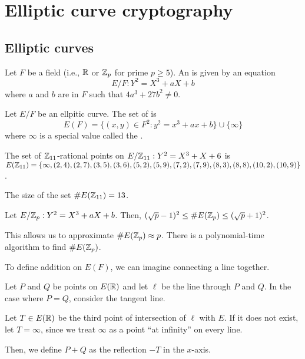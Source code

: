 \documentclass[class=co487,tikz,minted,notes]{agony}
\begin{document}
\chapter{Elliptic curve cryptography}
\section{Elliptic curves}

\begin{defn}
  Let $F$ be a field (i.e., $\mathbb{R}$ or $\mathbb{Z}_p$ for prime $p \geq 5$).
  An  is given by an equation
  \[ E/F : Y^2 = X^3 + aX + b \]
  where $a$ and $b$ are in $F$ such that $4a^3 + 27b^2 \neq 0$.
\end{defn}

\begin{defn}
  Let $E/F$ be an ellpitic curve.
  The set of  is
  \[ E(F) = \{(x,y) \in F^2 : y^2 = x^3 + ax + b\} \cup \{\infty\} \]
  where $\infty$ is a special value called the .
\end{defn}

\begin{example}\label{ex:ec1}
  The set of $\mathbb{Z}_{11}$-rational points on $E/\mathbb{Z}_{11} : Y^2 = X^3 + X + 6$
  is $E(\mathbb{Z}_{11}) = \{\infty, (2,4), (2,7), (3,5), (3,6), (5,2), (5,9),
    (7,2), (7,9), (8,3), (8,8), (10,2), (10,9)\}$.

  The size of the set $\#E(\mathbb{Z}_{11}) = 13$.
\end{example}

\begin{theorem}[Hasse]
  Let $E/\mathbb{Z}_p : Y^2 = X^3 + aX + b$.
  Then, $(\sqrt{p}-1)^2 \leq \#E(\mathbb{Z}_p) \leq (\sqrt{p}+1)^2$.
\end{theorem}

This allows us to approximate $\#E(\mathbb{Z}_p) \approx p$.
There is a polynomial-time algorithm to find $\#E(\mathbb{Z}_p)$.

To define addition on $E(F)$, we can imagine connecting a line together.

\begin{defn}
  Let $P$ and $Q$ be points on $E(\mathbb{R})$ and let $\ell$ be the line through $P$ and $Q$.
  In the case where $P = Q$, consider the tangent line.

  Let $T \in E(\mathbb{R})$ be the third point of intersection of $\ell$ with $E$.
  If it does not exist, let $T = \infty$, since we treat $\infty$
  as a point ``at infinity'' on every line.

  Then, we define $P + Q$ as the reflection $-T$ in the $x$-axis.
\end{defn}
\end{document}
